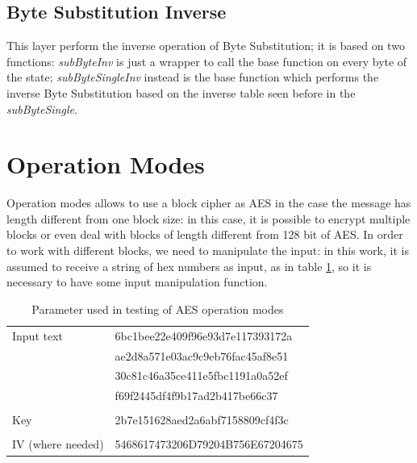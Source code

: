 \documentclass{article}
\begin{document}
\subsection{Byte Substitution Inverse}

This layer perform the inverse operation of Byte Substitution; it is based on two functions: \textit{subByteInv} is just a wrapper to call the base function on every byte of the state; \textit{subByteSingleInv} instead is the base function which performs the inverse Byte Substitution based on the inverse table seen before in the \textit{subByteSingle}.
 

\section{Operation Modes}

Operation modes allows to use a block cipher as AES in the case the message has length different from one block size: in this case, it is possible to encrypt multiple blocks or even deal with blocks of length different from 128 bit of AES. In order to work with different blocks, we need to manipulate the input: in this work, it is assumed to receive a string of hex numbers as input, as in table \ref{tab:AESparameter}, so it is necessary to have some input manipulation function.

\begin{table}[H]
\begin{center}
\begin{tabular}{ll}
Input text &  6bc1bee22e409f96e93d7e117393172a\\
	      &   ae2d8a571e03ac9c9eb76fac45af8e51\\
	      &   30c81c46a35ce411e5fbc1191a0a52ef\\
	      &   f69f2445df4f9b17ad2b417be66c37 \\
\\
Key & 2b7e151628aed2a6abf7158809cf4f3c\\
\\
IV (where needed) & 5468617473206D79204B756E67204675
\end{tabular}
\caption{Parameter used in testing of AES operation modes}
\label{tab:AESparameter}
\end{center}
\end{table}
\end{document}
